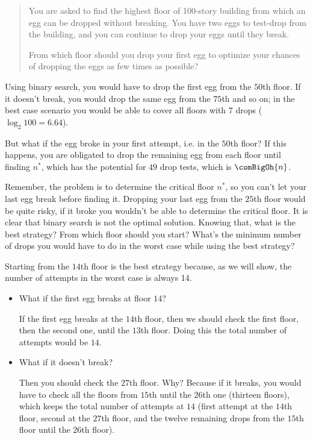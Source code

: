 \begin{quotation}\color{darkgray}
You are asked to find the highest floor of 100-story building from which an
egg can be dropped without breaking. You have two eggs to test-drop from the
building, and you can continue to drop your eggs until they break.

From which floor should you drop your first egg to optimize your chances of
dropping the eggs as few times as possible?
\end{quotation}
Using binary search, you would have to drop the first egg from the $50$th
floor. If it doesn't break, you would drop the same egg from the $75$th and
so on; in the best case scenario you would be able to cover all floors with
$7$ drops ($\log_2 100 = 6.64$).

But what if the egg broke in your first attempt, i.e. in the $50$th floor?
If this happens, you are obligated to drop the remaining egg from each floor
until finding $n^*$, which has the potential for $49$ drop tests, which is
$\comBigOh{n}$.

Remember, the problem is to determine the critical floor $n^*$, so you can't
let your last egg break before finding it. Dropping your last egg from the
$25$th floor would be quite risky, if it broke you wouldn't be able to
determine the critical floor. It is clear that binary search is not the
optimal solution. Knowing that, what is the best strategy? From which floor
should you start? What's the minimum number of drops you would have to do in
the worst case while using the best strategy?

Starting from the $14$th floor is the best strategy because, as we will
show, the number of attempts in the worst case is always 14.
\begin{itemize}%
\item What if the first egg breaks at floor $14$?

If the first egg breaks at the $14$th floor, then we should check the first
floor, then the second one, until the $13$th floor. Doing this the total
number of attempts would be $14$.
\item What if it doesn't break? 

Then you should check the $27$th floor. Why? Because if it breaks, you would
have to check all the floors from $15$th until the $26$th one (thirteen
floors), which keeps the total number of attempts at $14$ (first attempt at
the $14$th floor, second at the $27$th floor, and the twelve remaining drops
from the $15$th floor until the $26$th floor).
\end{itemize}

